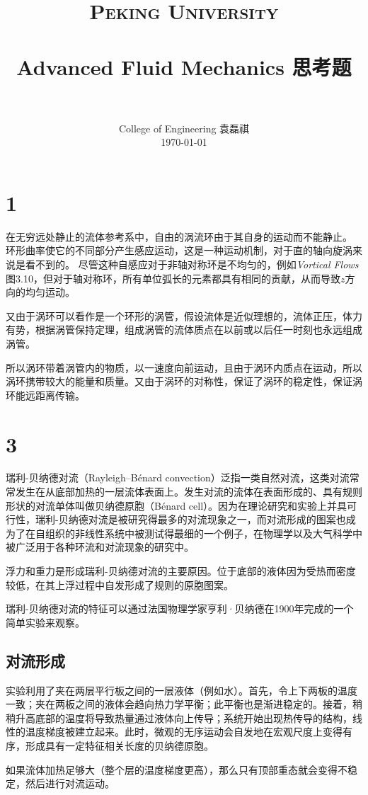 \documentclass[12pt]{article}
\title{
		\vspace{-1in} 	
		\usefont{OT1}{bch}{b}{n}
		\normalfont \normalsize \textsc{\LARGE Peking University}\\[1cm] %
		\horrule{0.5pt} \\[0.5cm]
		\huge \bfseries{Advanced Fluid Mechanics 思考题} \\
		\horrule{2pt} \\[0.5cm]
}
\author{
		\normalfont 								\normalsize
		College of Engineering \quad 2001111690  \quad 袁磊祺\\	\normalsize
        \today
}
\date{}
\begin{document}


\maketitle

\section{1}


在无穷远处静止的流体参考系中，自由的涡流环由于其自身的运动而不能静止。 环形曲率使它的不同部分产生感应运动，这是一种运动机制，对于直的轴向旋涡来说是看不到的。 尽管这种自感应对于非轴对称环是不均匀的，例如\emph{Vortical Flows}图3.10，但对于轴对称环，所有单位弧长的元素都具有相同的贡献，从而导致$z$方向的均匀运动。

又由于涡环可以看作是一个环形的涡管，假设流体是近似理想的，流体正压，体力有势，根据涡管保持定理，组成涡管的流体质点在以前或以后任一时刻也永远组成涡管。

所以涡环带着涡管内的物质，以一速度向前运动，且由于涡环内质点在运动，所以涡环携带较大的能量和质量。又由于涡环的对称性，保证了涡环的稳定性，保证涡环能远距离传输。


\section{3}

瑞利-贝纳德对流（Rayleigh–Bénard convection）泛指一类自然对流，这类对流常常发生在从底部加热的一层流体表面上。发生对流的流体在表面形成的、具有规则形状的对流单体叫做贝纳德原胞（Bénard cell）。因为在理论研究和实验上并具可行性，瑞利-贝纳德对流是被研究得最多的对流现象之一，而对流形成的图案也成为了在自组织的非线性系统中被测试得最细的一个例子，在物理学以及大气科学中被广泛用于各种环流和对流现象的研究中。

浮力和重力是形成瑞利-贝纳德对流的主要原因。位于底部的液体因为受热而密度较低，在其上浮过程中自发形成了规则的原胞图案。

瑞利-贝纳德对流的特征可以通过法国物理学家亨利·贝纳德在1900年完成的一个简单实验来观察。

\subsection{对流形成}

实验利用了夹在两层平行板之间的一层液体（例如水）。首先，令上下两板的温度一致；夹在两板之间的液体会趋向热力学平衡；此平衡也是渐进稳定的。接着，稍稍升高底部的温度将导致热量通过液体向上传导；系统开始出现热传导的结构，线性的温度梯度被建立起来。此时，微观的无序运动会自发地在宏观尺度上变得有序，形成具有一定特征相关长度的贝纳德原胞。

如果流体加热足够大（整个层的温度梯度更高），那么只有顶部重态就会变得不稳定，然后进行对流运动。


\nocite{*}


\end{document}
